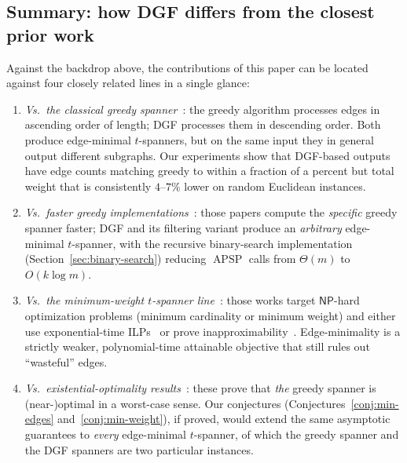 \documentclass{article}
\DeclareMathOperator{\APSP}{APSP}
\begin{document}
\subsection{Summary: how DGF differs from the closest prior work}
\label{subsec:rw-we-differ}

Against the backdrop above, the contributions of this paper can be
located against four closely related lines in a single glance:

\begin{enumerate}
    \item \emph{Vs.\ the classical greedy spanner}~\cite{ADDJS93,CDNS95}:
        the greedy algorithm processes edges in ascending order of
        length; DGF processes them in descending order. Both produce
        edge-minimal $t$-spanners, but on the same input they in
        general output different subgraphs. Our experiments show that
        DGF-based outputs have edge counts matching greedy to within
        a fraction of a percent but total weight that is consistently
        $4$--$7\%$ lower on random Euclidean instances.
    \item \emph{Vs.\ faster greedy implementations}~\cite{BCFMS10,ABBB15}:
        those papers compute the \emph{specific} greedy spanner
        faster; DGF and its filtering variant produce an
        \emph{arbitrary} edge-minimal $t$-spanner, with the recursive
        binary-search implementation (Section~\ref{sec:binary-search})
        reducing $\APSP$ calls from $\Theta(m)$ to $O(k\log m)$.
    \item \emph{Vs.\ the minimum-weight $t$-spanner line}~\cite{SZ04,Cai94,Kortsarz01}:
        those works target $\mathsf{NP}$-hard optimization problems
        (minimum cardinality or minimum weight) and either use
        exponential-time ILPs~\cite{SZ04} or prove
        inapproximability~\cite{Cai94,Kortsarz01}. Edge-minimality is
        a strictly weaker, polynomial-time attainable objective that
        still rules out ``wasteful'' edges.
    \item \emph{Vs.\ existential-optimality results}~\cite{FS20,LS25}:
        these prove that \emph{the} greedy spanner is (near-)optimal
        in a worst-case sense. Our conjectures
        (Conjectures~\ref{conj:min-edges} and~\ref{conj:min-weight}),
        if proved, would extend the same asymptotic guarantees to
        \emph{every} edge-minimal $t$-spanner, of which the greedy
        spanner and the DGF spanners are two particular instances.
\end{enumerate}
\end{document}
